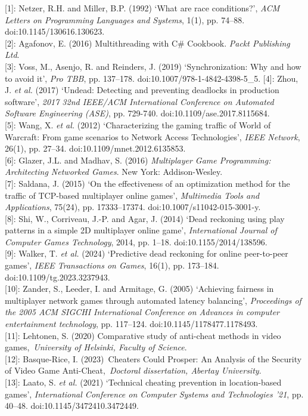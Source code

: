 \documentclass[
]{article}
\begin{document}
{[}1{]}: Netzer, R.H. and Miller, B.P. (1992) `What are race
conditions?', \emph{ACM Letters on Programming Languages and Systems},
1(1), pp. 74--88. doi:10.1145/130616.130623.\\
{[}2{]}: Agafonov, E. (2016) \textquotesingle Multithreading with C\#
Cookbook\textquotesingle. \emph{Packt Publishing Ltd}.\\
{[}3{]}: Voss, M., Asenjo, R. and Reinders, J. (2019) `Synchronization:
Why and how to avoid it', \emph{Pro TBB}, pp. 137--178.
doi:10.1007/978-1-4842-4398-5\_5.
{[}4{]}: Zhou, J. \emph{et al.} (2017) `Undead: Detecting and preventing deadlocks in production software', \emph{2017 32nd IEEE/ACM International Conference on Automated Software Engineering (ASE)}, pp. 729-740. doi:10.1109/ase.2017.8115684.\\
{[}5{]}: Wang, X. \emph{et al.} (2012) `Characterizing the gaming
traffic of World of Warcraft: From game scenarios to Network Access
Technologies', \emph{IEEE Network}, 26(1), pp. 27--34.
doi:10.1109/mnet.2012.6135853.\\
{[}6{]}: Glazer, J.L. and Madhav, S. (2016) \emph{Multiplayer Game
Programming: Architecting Networked Games}. New York: Addison-Wesley.\\
{[}7{]}: Saldana, J. (2015) `On the effectiveness of an optimization
method for the traffic of TCP-based multiplayer online games',
\emph{Multimedia Tools and Applications}, 75(24), pp. 17333--17374.
doi:10.1007/s11042-015-3001-y.\\
{[}8{]}: Shi, W., Corriveau, J.-P. and Agar, J. (2014) `Dead reckoning
using play patterns in a simple 2D multiplayer online game',
\emph{International Journal of Computer Games Technology}, 2014, pp.
1--18. doi:10.1155/2014/138596.\\
{[}9{]}: Walker, T. \emph{et al.} (2024) `Predictive dead reckoning for
online peer-to-peer games', \emph{IEEE Transactions on Games}, 16(1),
pp. 173--184. doi:10.1109/tg.2023.3237943.\\
{[}10{]}: Zander, S., Leeder, I. and Armitage, G. (2005) `Achieving
fairness in multiplayer network games through automated latency
balancing', \emph{Proceedings of the 2005 ACM SIGCHI International
Conference on Advances in computer entertainment technology}, pp.
117--124. doi:10.1145/1178477.1178493.\\
{[}11{]}: Lehtonen, S. (2020) \textquotesingle Comparative study of
anti-cheat methods in video games\textquotesingle,~\emph{University of
Helsinki, Faculty of Science}.\\
{[}12{]}: Basque-Rice, I. (2023)~\textquotesingle Cheaters Could Prosper:
An Analysis of the Security of Video Game
Anti-Cheat\textquotesingle,~\emph{Doctoral dissertation, Abertay
University}.\\
{[}13{]}: Laato, S. \emph{et al.} (2021) `Technical cheating prevention
in location-based games', \emph{International Conference on Computer
Systems and Technologies '21}, pp. 40--48.
doi:10.1145/3472410.3472449.\\
\end{document}

